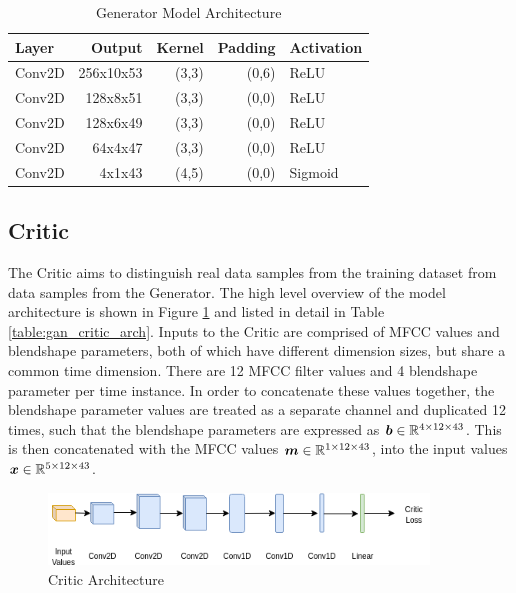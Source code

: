 \begin{table}[h!]
\centering
    \begin{tabular}{ l | r | r | r | l}
    \textbf{Layer} & \textbf{Output} & \textbf{Kernel} & \textbf{Padding} & \textbf{Activation} \\ \hline
    Conv2D & 256x10x53 & (3,3) & (0,6) & ReLU    \\ \hline
    Conv2D & 128x8x51  & (3,3) & (0,0) & ReLU    \\ \hline
    Conv2D & 128x6x49  & (3,3) & (0,0) & ReLU    \\ \hline
    Conv2D & 64x4x47   & (3,3) & (0,0) & ReLU    \\ \hline
    Conv2D & 4x1x43    & (4,5) & (0,0) & Sigmoid 
    \end{tabular} 
    \caption{Generator Model Architecture}\label{table:gan_gen_arch}
\end{table}

\subsection{Critic}
The Critic aims to distinguish real data samples from the training dataset from data samples from the Generator.
The high level overview of the model architecture is shown in Figure \ref{fig:gan_critic_arch} and listed in detail in Table \ref{table:gan_critic_arch}.
Inputs to the Critic are comprised of MFCC values and blendshape parameters, both of which have different dimension sizes, but share a common time dimension. 
There are 12 MFCC filter values and 4 blendshape parameter per time instance.
In order to concatenate these values together, the blendshape parameter values are treated as a separate channel and duplicated 12 times, such that the blendshape parameters are expressed as ${\boldsymbol{{b}}} \in \mathbb{R}^{4 \times 12 \times 43}$.
This is then concatenated with the MFCC values ${\boldsymbol{{m}}} \in \mathbb{R}^{1 \times 12 \times 43}$, into the input values ${\boldsymbol{{x}}} \in \mathbb{R}^{5 \times 12 \times 43}$.

\begin{figure}[h!]
    \centering
        \includegraphics[width=0.9\textwidth]{figures/gan/critic.png}
    \caption{Critic Architecture}\label{fig:gan_critic_arch}
\end{figure}

